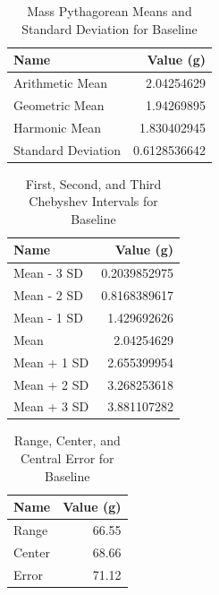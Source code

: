 \begin{table} \label{table.baseline.means}
    \centering
	\begin{tabular}{|l|r|} \hline
		\textbf{Name} & \textbf{Value (g)} \\
        \hline
		Arithmetic Mean & 2.04254629 \\
		Geometric Mean & 1.94269895 \\
        Harmonic Mean & 1.830402945 \\
        Standard Deviation & 0.6128536642 \\
		\hline
	\end{tabular}
	\caption{Mass Pythagorean Means and Standard Deviation for Baseline}
\end{table}
\begin{table} \label{table.baseline.chebyshev}
    \centering
	\begin{tabular}{|l|r|} \hline
		\textbf{Name} & \textbf{Value (g)} \\
		\hline
		Mean - 3 SD & 0.2039852975 \\
		Mean - 2 SD & 0.8168389617 \\
        Mean - 1 SD & 1.429692626 \\
        Mean & 2.04254629 \\
		Mean + 1 SD & 2.655399954 \\
        Mean + 2 SD & 3.268253618 \\
		Mean + 3 SD & 3.881107282 \\
		\hline
	\end{tabular}
	\caption{First, Second, and Third Chebyshev Intervals for Baseline}
\end{table}
\begin{table} \label{table.baseline.range}
    \centering
	\begin{tabular}{|l|r|} \hline
		\textbf{Name} & \textbf{Value (g)} \\
		\hline
		Range & 66.55 \\
	    Center & 68.66 \\
		Error & 71.12 \\
		\hline
	\end{tabular}
	\caption{Range, Center, and Central Error for Baseline}
\end{table}
